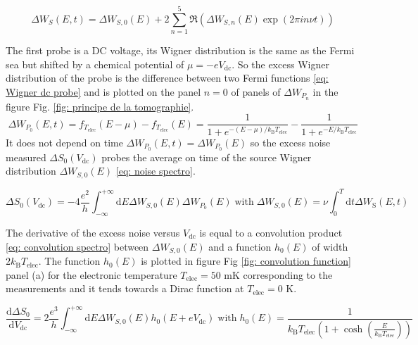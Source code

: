 \begin{equation}
\Delta W_{S}\left(E,t\right) = \Delta W_{S,0}\left(E\right)+2\sum_{n=1}^{5}\Re\left(\Delta W_{S,n}\left(E\right)\exp\left(2\pi i n \nu t\right)\right) \label{eq: time Fourier transform of Wigner}
\end{equation}

The first probe is a DC voltage, its Wigner distribution is the same as the Fermi sea but shifted by a chemical potential of $\mu = -eV_{\mathrm{dc}}$.
So the excess Wigner distribution of the probe is the difference between two Fermi functions \eqref{eq: Wigner dc probe} and is plotted on the panel $n = 0$ of panels of $\Delta W_{P_{n}}$ in the figure Fig. \ref{fig: principe de la tomographie}.
\begin{equation}
\Delta W_{P_{0}}\left(E,t\right) = f_{T_{\mathrm{elec}}}\left(E-\mu\right)-f_{T_{\mathrm{elec}}}\left(E\right) = \frac{1}{1+e^{-\left(E-\mu\right)/k_{\mathrm{B}}T_{\mathrm{elec}}}}-\frac{1}{1+e^{-E/k_{\mathrm{B}}T_{\mathrm{elec}}}} \label{eq: Wigner dc probe}
\end{equation}
It does not depend on time $\Delta W_{P_{0}}\left(E,t\right) = \Delta W_{P_{0}}\left(E\right)$ so the excess noise measured $\Delta S_{0}\left(V_{\mathrm{dc}}\right)$ probes the average on time of the source Wigner distribution $\Delta W_{S,0}\left(E\right)$ \eqref{eq: noise spectro}.

\begin{equation}
\Delta S_{0}\left(V_{\mathrm{dc}}\right) = -4\frac{e^{2}}{h}\int_{-\infty}^{+\infty}\mathrm{d}E\Delta W_{S,0}\left(E\right)\Delta W_{P_{0}}\left(E\right)\;\mathrm{with}\;\Delta W_{S,0}\left(E\right) = \nu\int_{0}^{T}\mathrm{d}t \Delta W_{\mathrm{S}}\left(E,t\right) \label{eq: noise spectro}
\end{equation}

The derivative of the excess noise versus $V_{\mathrm{dc}}$ is equal to a convolution product \eqref{eq: convolution spectro} between $\Delta W_{S,0}\left(E\right)$ and a function $h_{0}\left(E\right)$ of width $2k_{\mathrm{B}}T_{\mathrm{elec}}$.
The function $h_{0}\left(E\right)$ is plotted in figure Fig \ref{fig: convolution function} panel (a) for the electronic temperature $T_{\mathrm{elec}} = 50$ mK corresponding to the measurements and it tends towards a Dirac function at  $T_{\mathrm{elec}} = 0$ K.

\begin{equation}
\frac{\mathrm{d}\Delta S_{0}}{\mathrm{d}V_{\mathrm{dc}}} =  2\frac{e^{3}}{h}\int_{-\infty}^{+\infty} \mathrm{d}E \Delta W_{S,0}\left(E\right)h_{0}\left(E+eV_{\mathrm{dc}}\right)\;\mathrm{with}\;h_{0}\left(E\right) = \frac{1}{k_{\mathrm{B}}T_{\mathrm{elec}}\left(1+\cosh\left(\frac{E}{k_{\mathrm{B}}T_{\mathrm{elec}}}\right)\right)} \label{eq: convolution spectro}
\end{equation}

